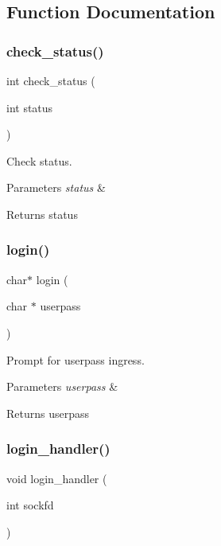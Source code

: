 \subsection{Function Documentation}
\mbox{\label{client_8c_af00002a7d3df82f54b2041a687797915}} 
\subsubsection{check\+\_\+status()}
{\footnotesize\ttfamily int check\+\_\+status (\begin{DoxyParamCaption}\item[{int}]{status }\end{DoxyParamCaption})}



Check status. 


\begin{DoxyParams}{Parameters}
{\em status} & \\
\hline
\end{DoxyParams}
\begin{DoxyReturn}{Returns}
status 
\end{DoxyReturn}
\mbox{\label{client_8c_a0d2a952bfee88348e1792d66acf01e38}} 
\subsubsection{login()}
{\footnotesize\ttfamily char$\ast$ login (\begin{DoxyParamCaption}\item[{char $\ast$}]{userpass }\end{DoxyParamCaption})}



Prompt for userpass ingress. 


\begin{DoxyParams}{Parameters}
{\em userpass} & \\
\hline
\end{DoxyParams}
\begin{DoxyReturn}{Returns}
userpass 
\end{DoxyReturn}
\mbox{\label{client_8c_a471ae164131962c0fe21a47e23706139}} 
\subsubsection{login\+\_\+handler()}
{\footnotesize\ttfamily void login\+\_\+handler (\begin{DoxyParamCaption}\item[{int}]{sockfd }\end{DoxyParamCaption})}



